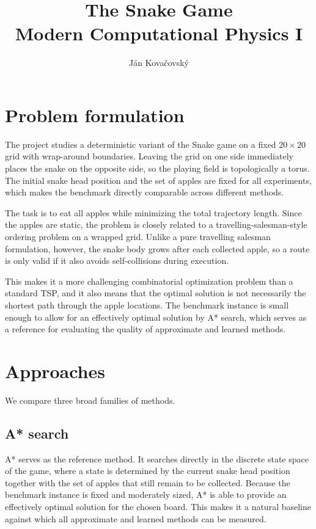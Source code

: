 \documentclass{article}
\title{The Snake Game\\\large Modern Computational Physics I}
\author{Ján Kovačovský}
\date{}
\begin{document}
\maketitle

\section{Problem formulation}

The project studies a deterministic variant of the Snake game on a fixed $20 \times 20$ grid with wrap-around boundaries. Leaving the grid on one side immediately places the snake on the opposite side, so the playing field is topologically a torus. The initial snake head position and the set of apples are fixed for all experiments, which makes the benchmark directly comparable across different methods.

The task is to eat all apples while minimizing the total trajectory length. Since the apples are static, the problem is closely related to a travelling-salesman-style ordering problem on a wrapped grid. Unlike a pure travelling salesman formulation, however, the snake body grows after each collected apple, so a route is only valid if it also avoids self-collisions during execution.

This makes it a more challenging combinatorial optimization problem than a standard TSP, and it also means that the optimal solution is not necessarily the shortest path through the apple locations. The benchmark instance is small enough to allow for an effectively optimal solution by A* search, which serves as a reference for evaluating the quality of approximate and learned methods.

\section{Approaches}

We compare three broad families of methods.

\subsection{A* search}

A* serves as the reference method. It searches directly in the discrete state space of the game, where a state is determined by the current snake head position together with the set of apples that still remain to be collected. Because the benchmark instance is fixed and moderately sized, A* is able to provide an effectively optimal solution for the chosen board. This makes it a natural baseline against which all approximate and learned methods can be measured.
\end{document}
